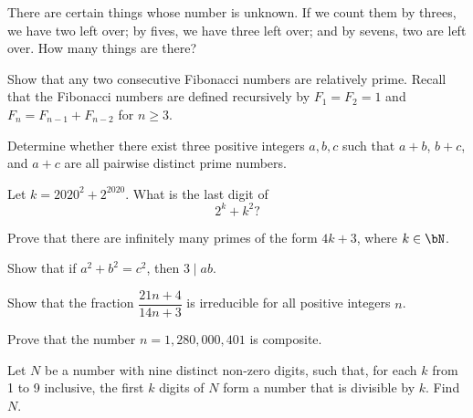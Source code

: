 \documentclass[12pt]{article}
\begin{document}
        \begin{exercise}
            There are certain things whose number is unknown. 
            If we count them by threes, we have two left over; by fives, we have three left over; and by sevens, two are left over. 
            How many things are there?
        \end{exercise}
    
        \begin{exercise}
            Show that any two consecutive Fibonacci numbers are relatively prime. 
            Recall that the Fibonacci numbers are defined recursively by \(F_1=F_2=1\) and \(F_n=F_{n-1}+F_{n-2}\) for \(n\geq 3\).
        \end{exercise}
    
        \begin{exercise}
            Determine whether there exist three positive integers \(a,b,c\) such that \(a+b\), \(b+c\), and \(a+c\) are all pairwise distinct prime numbers.
        \end{exercise}
    
        \begin{exercise}
            Let \(k=2020^2+2^{2020}\).
            What is the last digit of
            \[2^k+k^2\textrm{?}\]
        \end{exercise}
    
        \begin{exercise}
            Prove that there are infinitely many primes of the form \(4k+3\), where \(k\in\bN\).
        \end{exercise}
    
        \begin{exercise}
            Show that if \(a^2+b^2=c^2\), then \(3\mid ab\).
        \end{exercise}
    
        \begin{exercise}
            Show that the fraction \(\dfrac{21n+4}{14n+3}\) is irreducible for all positive integers \(n\).
        \end{exercise}
    
        \begin{exercise}
            Prove that the number \(n=1,280,000,401\) is composite.
        \end{exercise}
    
        \begin{exercise}
            Let \(N\) be a number with nine distinct non-zero digits, such that, for each \(k\) from 1 to 9 inclusive, the first \(k\) digits of \(N\) form a number that is divisible by \(k\). 
            Find \(N\).
        \end{exercise}
        
\end{document}
